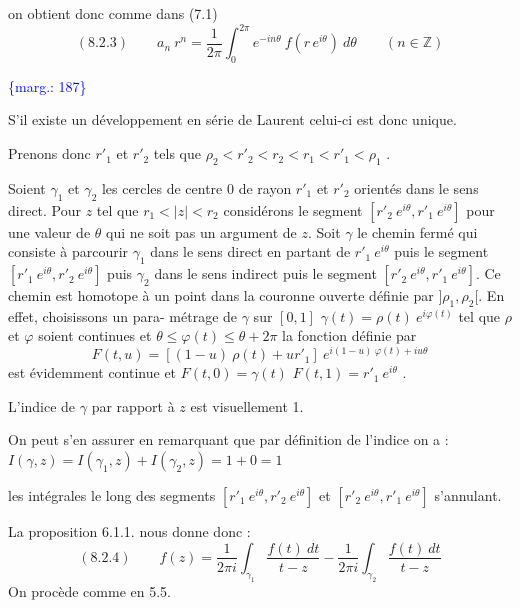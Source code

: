 \documentclass[11pt]{article}
\newcommand{\scanpage}[1]{\par\bigskip\noindent{\small\sffamily[scan #1]}\par}
\newcommand{\mspage}[1]{{\small\sffamily[p.\,#1]}}
\newcommand{\margin}[1]{\textcolor{blue}{\{\textsf{marg.:} #1\}}}
\begin{document}
on obtient donc comme dans (7.1)
\[
(8.2.3) \qquad a_n\ r^{n} = \frac{1}{2\pi} \int_0^{2\pi} e^{-in\theta}\ f(r\, e^{i\theta})\ d\theta \qquad (n \in \mathbb{Z})
\]

\margin{187}

\clearpage
\scanpage{119/188}
\mspage{-7-}

S'il existe un développement en série de Laurent celui-ci est donc unique.

Prenons donc $r'_1$ et $r'_2$ tels que $\rho_2 < r'_2 < r_2 < r_1 < r'_1 < \rho_1$ .

Soient $\gamma_1$ et $\gamma_2$ les cercles de centre 0 de rayon $r'_1$ et $r'_2$ orientés
dans le sens direct. Pour $z$ tel que $r_1 < |z| < r_2$ considérons le segment
$[r'_2\ e^{i\theta}, r'_1\ e^{i\theta}]$ pour une valeur de $\theta$ qui ne soit pas un argument de $z$.
Soit $\gamma$ le chemin fermé qui consiste à parcourir $\gamma_1$ dans le sens direct en
partant de $r'_1\ e^{i\theta}$ puis le segment $[r'_1\ e^{i\theta}, r'_2\ e^{i\theta}]$ puis $\gamma_2$ dans le sens
indirect puis le segment $[r'_2\ e^{i\theta}, r'_1\ e^{i\theta}]$. Ce chemin est homotope à un point
dans la couronne ouverte définie par $]\rho_1 , \rho_2[$. En effet, choisissons un para-%
métrage de $\gamma$ sur $[0,1]$ $\gamma(t) = \rho(t)\ e^{i\varphi(t)}$ tel que $\rho$et $\varphi$ soient continues
et $\theta \leq \varphi(t) \leq \theta+2\pi$ la fonction définie par
\[ F(t,u) = [(1-u)\ \rho(t) + ur'_1]\ e^{i(1-u)\ \varphi(t) + iu\theta} \]
est évidemment continue et $F(t,0) = \gamma(t)$ \quad $F(t,1) = r'_1\ e^{i\theta}$ .

L'indice de $\gamma$ par rapport à $z$ est visuellement 1.

On peut s'en assurer en remarquant que par définition de l'indice
on a : \qquad $I(\gamma,z) = I(\gamma_1,z) + I(\gamma_2,z) = 1+0 = 1$

les intégrales le long des segments $[r'_1\ e^{i\theta}, r'_2\ e^{i\theta}]$ et
$[r'_2\ e^{i\theta}, r'_1\ e^{i\theta}]$ s'annulant.

La proposition 6.1.1. nous donne donc :
\[ (8.2.4) \qquad f(z) = \frac{1}{2\pi i}\int_{\gamma_1} \frac{f(t)\ dt}{t-z} - \frac{1}{2\pi i}\int_{\gamma_2} \frac{f(t)\ dt}{t-z} \]
On procède comme en 5.5.
\end{document}
